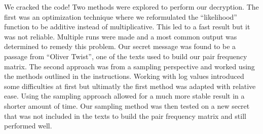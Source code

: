 \documentclass{article}
\begin{document}
We cracked the code! Two methods were explored to perform our
decryption. The first was an optimization technique where we
reformulated the ``likelihood'' function to be additive instead of
multiplicative. This led to a fast result but it was not reliable.
Multiple runs were made and a most common output was determined to
remedy this problem. Our secret message was found to be a passage from
``Oliver Twist'', one of the texts used to build our pair frequency
matrix. The second approach was from a sampling perspective and worked
using the methods outlined in the instructions. Working with log values
introduced some difficulties at first but ultimatly the first method was
adapted with relative ease. Using the sampling approach allowed for a
much more stable result in a shorter amount of time. Our sampling method
was then tested on a new secret that was not included in the texts to
build the pair frequency matrix and still performed well.


    
    
    
    
\end{document}

